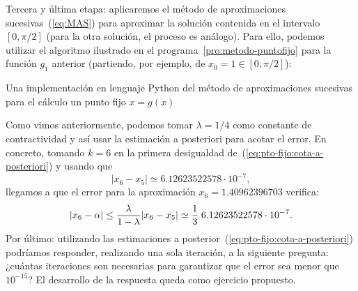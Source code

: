 \begin{example}
  \textsf{Tercera y última etapa}: aplicaremos el método de
  aproximaciones sucesivas~(\ref{eq:MAS}) para aproximar la solución
  contenida en el intervalo $[0,\pi/2]$ (para la otra solución, el
  proceso es análogo). Para ello, podemos utilizar el algoritmo
  ilustrado en el programa~\ref{pro:metodo-puntofijo} para la función
  $g_1$ anterior (partiendo, por ejemplo, de $x_0=1\in [0,\pi/2]$):
  \begin{pythonoutput}
  \end{pythonoutput}
  \label{ex:punto-fijo-1}
  \begin{program}
    \caption{Una implementación en lenguaje Python del método de
      aproximaciones sucesivas para el cálculo un punto fijo $x=g(x)$}
    \label{pro:metodo-puntofijo}
  \end{program}

  Como vimos anteriormente, podemos tomar
  $\lambda=1/4$ como constante de contractividad y así usar la
  estimación a posteriori para acotar el error. En concreto, tomando
  $k=6$ en la primera desigualdad
  de~(\ref{eq:pto-fijo:cota-a-posteriori}) y usando que
  $$
  |x_{6}-x_{5}| \simeq 6.12623522578 \cdot 10^{-7},
  $$
  llegamos a que el error para la aproximación $x_6=1.40962396703$ verifica:
  $$
  |x_6-\alpha| \le \frac{\lambda}{1-\lambda}
  |x_6-x_{5}|
  \simeq \frac{1}{3}\; 6.12623522578 \cdot 10^{-7}.
  $$
  Por último: utilizando las estimaciones a
  posterior~(\ref{eq:pto-fijo:cota-a-posteriori}) podríamos responder,
  realizando una sola iteración, a la siguiente pregunta: ¿cuántas
  iteraciones son necesarias para garantizar que el error sea menor que
  $10^{-15}$? El desarrollo de la respuesta queda como ejercicio
  propuesto.
\end{example}

